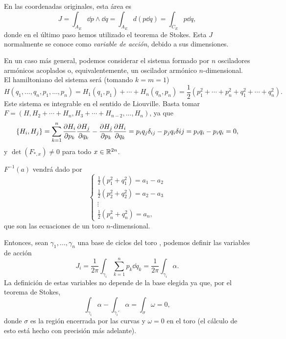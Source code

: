 \begin{ejemplo}
  En las coordenadas originales, esta área es
  \begin{equation*}
    J=\int_{A_E} \dd p \wedge \dd q = \int_{A_E}d (p\dd q) = \int_{C_E} p \dd q,
  \end{equation*}
  donde en el último paso hemos utilizado el teorema de Stokes. Esta $J$ normalmente se conoce como \emph{variable de acción}, debido a sus dimensiones.

  En un caso más general, podemos considerar el sistema formado por $n$ osciladores armónicos acoplados o, equivalentemente, un oscilador armónico $n$-dimensional. El hamiltoniano del sistema será (tomando $k=m=1$)
  \begin{equation*}
    H(q_1,\dots,q_n,p_1,\dots,p_n)= H_1(q_1,p_1)+ \cdots +H_n(q_n,p_n) = \frac{1}{2}(p_1^2+\cdots+p_n^2+q_1^2+\cdots+q_n^2).
  \end{equation*}
  Este sistema es integrable en el sentido de Liouville. Basta tomar $F=(H,H_2+\cdots+H_{n},H_3+\cdots+H_{n-2},\dots,H_n)$, ya que 
  \begin{equation*}
    \left\lbrace H_i,H_j\right\rbrace = \sum_{k=1}^n \frac{\partial H_i}{\partial p_k}\frac{\partial H_j}{\partial q_k} - \frac{\partial H_j}{\partial p_k}\frac{\partial H_i}{\partial q_k}= p_iq_j \delta_{ij} - p_jq_i \delta{ij} = p_iq_i-p_iq_i = 0,
  \end{equation*}
  y $\det(F_{*,x}) \neq 0$ para todo $x \in \mathbb{R}^{2n}$. 
  
  $F^{-1}(a)$ vendrá dado por 
  \begin{equation*}
    \left\lbrace
    \begin{array}{l}
      \frac{1}{2}(p_1^2+q_1^2)=a_1-a_2 \\
      \frac{1}{2}(p_2^2+q_2^2)=a_2-a_3 \\
\vdots \\
\frac{1}{2}(p_n^2+q_n^2)=a_n, 
    \end{array}
    \right.
  \end{equation*}
  que son las ecuaciones de un toro $n$-dimensional.

  Entonces, sean $\gamma_1,\dots,\gamma_n$ una base de ciclos del toro , podemos definir las variables de acción 
  \begin{equation*}
    J_i = \frac{1}{2\pi}\int_{\gamma_i} \sum_{k=1}^n p_k \dd q_k = \frac{1}{2\pi} \int_{\gamma_i} \alpha.
  \end{equation*}
  La definición de estas variables no depende de la base elegida ya que, por el teorema de Stokes,
  \begin{equation*}
    \int_{\gamma_i} \alpha - \int_{\gamma_i'} \alpha = \int_{\sigma} \omega=0,
  \end{equation*}
  donde $\sigma$ es la región encerrada por las curvas y $\omega=0$ en el toro (el cálculo de esto está hecho con precisión más adelante).


\end{ejemplo}
